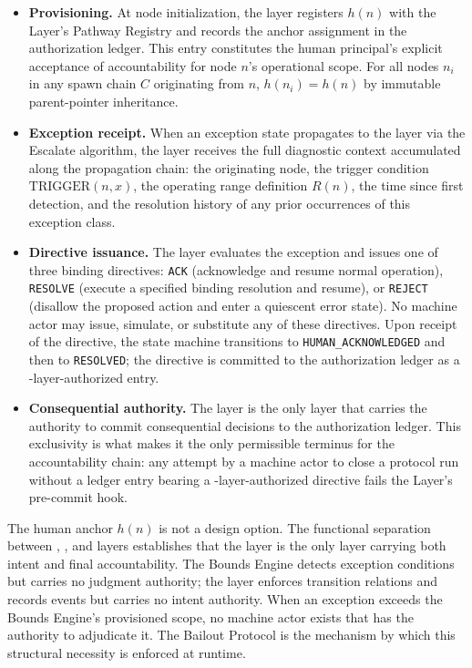 \begin{itemize}\itemsep=0pt
\item[(\textit{i})] \textbf{Provisioning.} At node initialization, the \purpose{} layer registers $h(n)$ with the \fact{} Layer's Pathway Registry and records the anchor assignment in the authorization ledger. This entry constitutes the human principal's explicit acceptance of accountability for node $n$'s operational scope. For all nodes $n_i$ in any spawn chain $C$ originating from $n$, $h(n_i) = h(n)$ by immutable parent-pointer inheritance.

\item[(\textit{ii})] \textbf{Exception receipt.} When an exception state propagates to the \purpose{} layer via the Escalate algorithm, the \purpose{} layer receives the full diagnostic context accumulated along the propagation chain: the originating node, the trigger condition $\text{TRIGGER}(n, x)$, the operating range definition $R(n)$, the time since first detection, and the resolution history of any prior occurrences of this exception class.

\item[(\textit{iii})] \textbf{Directive issuance.} The \purpose{} layer evaluates the exception and issues one of three binding directives: \texttt{ACK} (acknowledge and resume normal operation), \texttt{RESOLVE} (execute a specified binding resolution and resume), or \texttt{REJECT} (disallow the proposed action and enter a quiescent error state). No machine actor may issue, simulate, or substitute any of these directives. Upon receipt of the directive, the state machine transitions to \texttt{HUMAN\_ACKNOWLEDGED} and then to \texttt{RESOLVED}; the directive is committed to the authorization ledger as a \purpose{}-layer-authorized entry.

\item[(\textit{iv})] \textbf{Consequential authority.} The \purpose{} layer is the only layer that carries the authority to commit consequential decisions to the authorization ledger. This exclusivity is what makes it the only permissible terminus for the accountability chain: any attempt by a machine actor to close a protocol run without a ledger entry bearing a \purpose{}-layer-authorized directive fails the \fact{} Layer's pre-commit hook.
\end{itemize}

The human anchor $h(n)$ is not a design option. The functional separation between \purpose{}, \bounds{}, and \fact{} layers establishes that the \purpose{} layer is the only layer carrying both intent and final accountability. The Bounds Engine detects exception conditions but carries no judgment authority; the \fact{} layer enforces transition relations and records events but carries no intent authority. When an exception exceeds the Bounds Engine's provisioned scope, no machine actor exists that has the authority to adjudicate it. The Bailout Protocol is the mechanism by which this structural necessity is enforced at runtime.

